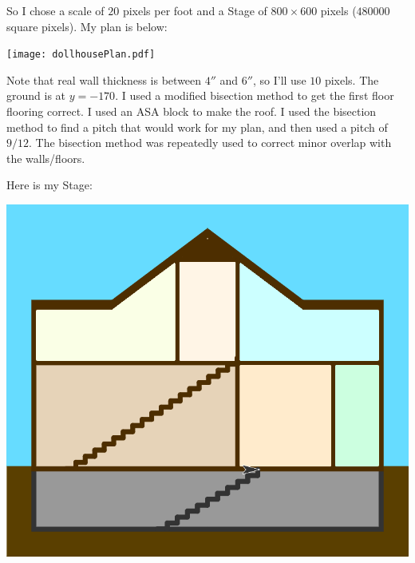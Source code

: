 \documentclass[noauthor,nooutcomes,12pt,hints]{ximera}
\begin{document}
\begin{freeResponse}
  So I chose a scale of $20$ pixels per foot and a Stage of $800\times
  600$ pixels ($480000$ square pixels). My plan is below:
  \begin{center}
    \texttt{[image: dollhousePlan.pdf]}
  \end{center}
  Note that real wall thickness is between $4''$ and $6''$, so I'll
  use $10$ pixels. The ground is at $y=-170$. I used a modified
  bisection method to get the first floor flooring correct. I used an
  ASA block to make the roof. I used the bisection method to find a
  pitch that would work for my plan, and then used a pitch of
  $9/12$. The bisection method was repeatedly used to correct minor
  overlap with the walls/floors.

  Here is my Stage:
  \begin{center}
    \includegraphics[width=.9\textwidth]{dollhouseStage.png}
  \end{center}
  
  
\end{freeResponse}
\end{document}
